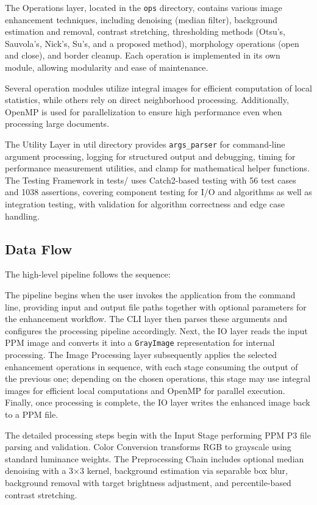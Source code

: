 The Operations layer, located in the \texttt{ops} directory, contains various image enhancement techniques, including denoising (median filter), background estimation and removal, contrast stretching, thresholding methods (Otsu's, Sauvola's, Nick's, Su's, and a proposed method), morphology operations (open and close), and border cleanup. Each operation is implemented in its own module, allowing modularity and ease of maintenance.

Several operation modules utilize integral images for efficient computation of local statistics, while others rely on direct neighborhood processing. Additionally, OpenMP is used for parallelization to ensure high performance even when processing large documents.

The Utility Layer in util directory provides \texttt{args\_parser} for command-line argument processing, logging for structured output and debugging, timing for performance measurement utilities, and clamp for mathematical helper functions. The Testing Framework in tests/ uses Catch2-based testing with 56 test cases and 1038 assertions, covering component testing for I/O and algorithms as well as integration testing, with validation for algorithm correctness and edge case handling.




\subsection{Data Flow}

The high-level pipeline follows the sequence:

The pipeline begins when the user invokes the application from the command line, providing input and output file paths together with optional parameters for the enhancement workflow. The CLI layer then parses these arguments and configures the processing pipeline accordingly. Next, the IO layer reads the input PPM image and converts it into a \texttt{GrayImage} representation for internal processing. The Image Processing layer subsequently applies the selected enhancement operations in sequence, with each stage consuming the output of the previous one; depending on the chosen operations, this stage may use integral images for efficient local computations and OpenMP for parallel execution. Finally, once processing is complete, the IO layer writes the enhanced image back to a PPM file.


The detailed processing steps begin with the Input Stage performing PPM P3 file parsing and validation. Color Conversion transforms RGB to grayscale using standard luminance weights. The Preprocessing Chain includes optional median denoising with a 3×3 kernel, background estimation via separable box blur, background removal with target brightness adjustment, and percentile-based contrast stretching.

